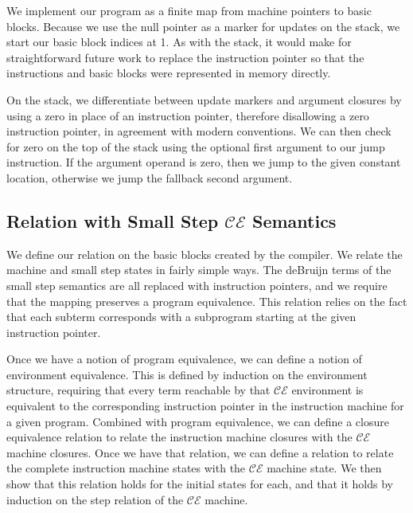 We implement our program as a finite map from machine pointers to basic blocks. 
Because we use the null pointer as a marker for updates on the stack, we start
our basic block indices at 1. As with the stack, it would make for
straightforward future work to replace the instruction pointer so that the
instructions and basic blocks were represented in memory directly. 

On the stack, we differentiate between update markers and argument closures by
using a zero in place of an instruction pointer, therefore disallowing a zero
instruction pointer, in agreement with modern conventions. We can then check for
zero on the top of the stack using the optional first argument to our jump
instruction. If the argument operand is zero, then we jump to the given
constant location, otherwise we jump the fallback second argument. 

\subsection{Relation with Small Step $\mathcal{CE}$ Semantics}

We define our relation on the basic blocks created by the compiler. We relate
the machine and small step states in fairly simple ways. The deBruijn terms of
the small step semantics are all replaced with instruction pointers, and we
require that the mapping preserves a program equivalence. This relation relies
on the fact that each subterm corresponds with a subprogram starting at the given
instruction pointer.
 
Once we have a notion of program equivalence, we can define a notion of
environment equivalence. This is defined by induction on the environment
structure, requiring that every term reachable by that $\mathcal{CE}$
environment is equivalent to the corresponding instruction pointer in the 
instruction machine for a given program. Combined with program equivalence, we
can define a closure equivalence relation to relate the instruction machine closures
with the $\mathcal{CE}$ machine closures. Once we have that relation, we can
define a relation to relate the complete instruction machine states with the
$\mathcal{CE}$ machine state. We then show that this relation holds for the
initial states for each, and that it holds by induction on the step relation
of the $\mathcal{CE}$ machine.

\begin{figure}
\begin{lstlisting}

\end{lstlisting}
\caption{}
\end{figure}

